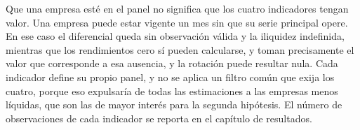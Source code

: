 Que una empresa esté en el panel no significa que los cuatro indicadores tengan valor. Una empresa puede estar vigente un mes sin que su serie principal opere. En ese caso el diferencial queda sin observación válida y la iliquidez indefinida, mientras que los rendimientos cero sí pueden calcularse, y toman precisamente el valor que corresponde a esa ausencia, y la rotación puede resultar nula. Cada indicador define su propio panel, y no se aplica un filtro común que exija los cuatro, porque eso expulsaría de todas las estimaciones a las empresas menos líquidas, que son las de mayor interés para la segunda hipótesis. El número de observaciones de cada indicador se reporta en el capítulo de resultados.


